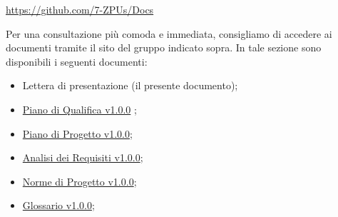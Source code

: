 \documentclass[a4paper,12pt]{article}
\begin{document}
\begin{center}
\href{https://github.com/7-ZPUs/Docs}{https://github.com/7-ZPUs/Docs}
\end{center}
Per una consultazione più comoda e immediata, consigliamo di accedere ai documenti tramite il sito del gruppo indicato sopra.
\newpage
\noindent In tale sezione sono disponibili i seguenti documenti:
\vspace{0.3cm}

\begin{itemize}
    \item Lettera di presentazione (il presente documento);
    \item \href{https://7-zpus.github.io/Docs/assets/2_RTB/DocumentiEsterni/PianoDiQualifica.pdf}{Piano di Qualifica v1.0.0} ;
    \item \href{https://7-zpus.github.io/Docs/assets/2_RTB/DocumentiEsterni/PianoDiProgetto.pdf}{Piano di Progetto v1.0.0};
    \item \href{https://7-zpus.github.io/Docs/assets/2_RTB/DocumentiEsterni/AnalisiDeiRequisiti.pdf}{Analisi dei Requisiti v1.0.0};
    \item \href{https://7-zpus.github.io/Docs/assets/2_RTB/DocumentiInterni/NormeDiProgetto.pdf}{Norme di Progetto v1.0.0};
    \item \href{https://7-zpus.github.io/Docs/assets/2_RTB/DocumentiInterni/Glossario.pdf}{Glossario v1.0.0};
\end{itemize}
\end{document}
